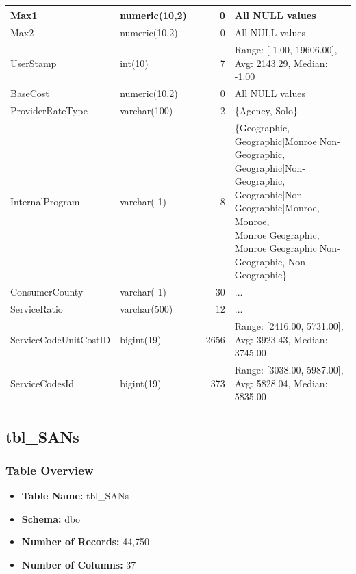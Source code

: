 \begin{landscape}
\begin{longtable}{|l|l|l|r|p{6cm}|}
\hline
Max1 & numeric(10,2) &  & 0 & All NULL values \\
\hline
Max2 & numeric(10,2) &  & 0 & All NULL values \\
\hline
UserStamp & int(10) &  & 7 & Range: [-1.00, 19606.00], Avg: 2143.29, Median: -1.00 \\
\hline
BaseCost & numeric(10,2) &  & 0 & All NULL values \\
\hline
ProviderRateType & varchar(100) &  & 2 & \{Agency, Solo\} \\
\hline
InternalProgram & varchar(-1) &  & 8 & \{Geographic, Geographic|Monroe|Non-Geographic, Geographic|Non-Geographic, Geographic|Non-Geographic|Monroe, Monroe, Monroe|Geographic, Monroe|Geographic|Non-Geographic, Non-Geographic\} \\
\hline
ConsumerCounty & varchar(-1) &  & 30 & ... \\
\hline
ServiceRatio & varchar(500) &  & 12 & ... \\
\hline
ServiceCodeUnitCostID & bigint(19) &  & 2656 & Range: [2416.00, 5731.00], Avg: 3923.43, Median: 3745.00 \\
\hline
ServiceCodesId & bigint(19) &  & 373 & Range: [3038.00, 5987.00], Avg: 5828.04, Median: 5835.00 \\
\hline
\end{longtable}

\subsection{tbl\_SANs}

\subsubsection{Table Overview}
\begin{itemize}
\item \textbf{Table Name:} tbl\_SANs
\item \textbf{Schema:} dbo
\item \textbf{Number of Records:} 44,750
\item \textbf{Number of Columns:} 37
\end{itemize}


\end{landscape}
